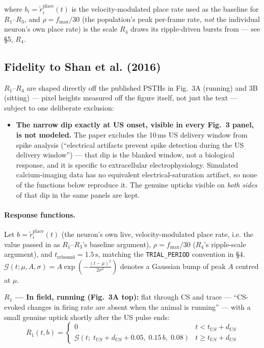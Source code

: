 \documentclass{article}
\begin{document}
\noindent
where $b_i = \tilde{r}^{\mathrm{place}}_i(t)$ is the velocity-modulated place rate
used as the baseline for $R_1$--$R_3$, and $\rho = f_{\max}/30$ (the population's
peak per-frame rate, \emph{not} the individual neuron's own place rate) is the scale
$R_4$ draws its ripple-driven bursts from --- see \S5, $R_4$.

\subsection*{Fidelity to Shan et al. (2016)}

$R_1$--$R_4$ are shaped directly off the published PSTHs in Fig.\ 3A (running) and
3B (sitting) --- pixel heights measured off the figure itself, not just the text ---
subject to one deliberate exclusion:

\begin{itemize}
    \item \textbf{The narrow dip exactly at US onset, visible in every Fig.\ 3 panel,
    is not modeled.} The paper excludes the 10\,ms US delivery window from spike
    analysis (``electrical artifacts prevent spike detection during the US delivery
    window'') --- that dip is the blanked window, not a biological response, and it is
    specific to extracellular electrophysiology. Simulated calcium-imaging data has no
    equivalent electrical-saturation artifact, so none of the functions below reproduce
    it. The genuine upticks visible on \emph{both sides} of that dip in the same panels
    are kept.
\end{itemize}

\paragraph{Response functions.}
Let $b = \tilde{r}^{\mathrm{place}}_i(t)$ (the neuron's own live, velocity-modulated
place rate, i.e. the value passed in as $R_1$--$R_3$'s baseline argument), $\rho =
f_{\max}/30$ ($R_4$'s ripple-scale argument), and $t_{\mathrm{rebound}} =
1.5\,\text{s}$, matching the \texttt{TRIAL\_PERIOD} convention in \S4. $\mathcal{G}(t;
\mu, A, \sigma) = A \exp\!\left(-\frac{(t-\mu)^2}{2\sigma^2}\right)$ denotes a Gaussian
bump of peak $A$ centred at $\mu$.

\medskip\noindent
\textbf{$R_1$ --- In field, running (Fig.\ 3A top):} flat through CS and trace ---
``CS-evoked changes in firing rate are absent when the animal is running'' --- with a
small genuine uptick shortly after the US pulse ends:
\begin{equation}
    R_1(t, b) = \begin{cases}
        0 & t < t_{US} + d_{US} \\[4pt]
        \mathcal{G}(t;\; t_{US}+d_{US}+0.05,\; 0.15\,b,\; 0.08) & t \geq t_{US} + d_{US}
    \end{cases}
\end{equation}
\end{document}
